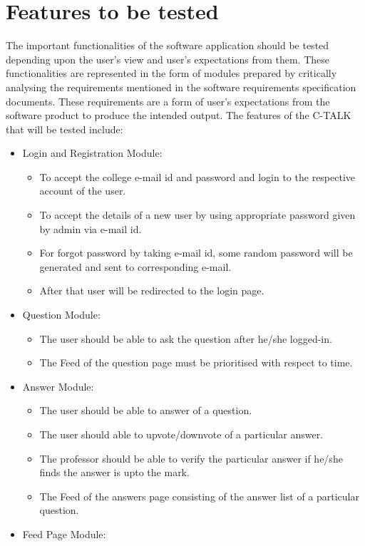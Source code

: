 \documentclass[12pt]{article}
\begin{document}
\section{Features to be tested}
The important functionalities of the software application should be tested depending upon the user’s view and user’s expectations from them. These functionalities are represented in the form of modules prepared by critically analysing the requirements mentioned in the software requirements specification documents. These requirements are a form of user’s expectations from the software product to produce the intended output. The features of the C-TALK that will be tested include:
\begin{itemize}
    \item Login and Registration Module:\\
    \begin{itemize}
        
    \item To accept the college e-mail id and password and login to the respective account of the user.
    \item To accept the details of a new user by using appropriate password given by admin via e-mail id.
    \item For forgot password by taking e-mail id, some random password will be generated and sent to corresponding e-mail.
    \item After that user will be redirected to the login page.
    \end{itemize}
    \item Question Module:\\
    \begin{itemize}
        
    \item The user should be able to ask the question after he/she logged-in.
    \item The Feed of the question page must be prioritised with respect to time.
    \end{itemize}
    \item Answer Module:\\
    \begin{itemize}
    \item The user should be able to answer of a question.
    \item The user should able to upvote/downvote of a particular answer.
    \item The professor should be able to verify the particular answer if he/she finds the answer is upto the mark.
    \item The Feed of the answers page consisting of the answer list of a particular question.
    \end{itemize}
    \item Feed Page Module:\\
\begin{itemize}
    


\end{itemize}
\end{itemize}
\end{document}
